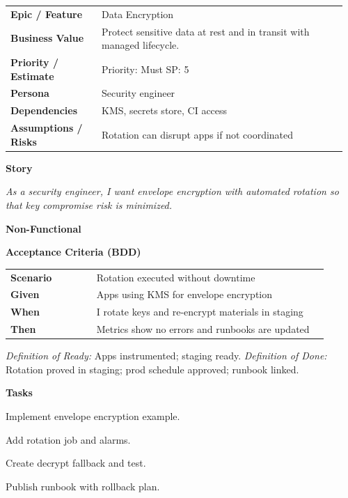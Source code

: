 \documentclass[11pt,letterpaper]{article}
\makeatletter
\newenvironment{kvtable}{%
  \par\noindent\begin{tabular}{@{}>{\raggedright\bfseries\arraybackslash}p{0.26\linewidth} >{\raggedright\arraybackslash}p{0.70\linewidth}@{}}
}{\end{tabular}\par}
\newenvironment{bdd}{%
  \par\noindent\begin{tabular}{@{}>{\raggedright\bfseries\arraybackslash}p{0.26\linewidth} >{\raggedright\arraybackslash}p{0.70\linewidth}@{}}
}{\end{tabular}\par}
\newcommand{\DoRDoD}[2]{%
  \vspace{0.35em}
  {\footnotesize\color{Muted}%
    \textit{Definition of Ready:} #1 \; \textbullet\;
    \textit{Definition of Done:} #2%
  }%
}
\newenvironment{storycard}[2]{%
  \begin{tcolorbox}[cloudcard, title={#1 --- #2}]%
}{\end{tcolorbox}}
\newcommand{\sectionlabel}[1]{\par\vspace{0.35em}\textbf{#1}\par}
\makeatother
\begin{document}
\begin{storycard}{CCS-11}{Ch. 11 — Cryptographic Key Management}
\begin{kvtable}
Epic / Feature & Data Encryption\\
Business Value & Protect sensitive data at rest and in transit with managed lifecycle.\\
Priority / Estimate & Priority: Must \quad SP: 5\\
Persona & Security engineer\\
Dependencies & KMS, secrets store, CI access\\
Assumptions / Risks & Rotation can disrupt apps if not coordinated\\
\end{kvtable}
\sectionlabel{Story}
\textit{As a security engineer, I want envelope encryption with automated rotation so that key compromise risk is minimized.}
\sectionlabel{Non-Functional}\;\;
\sectionlabel{Acceptance Criteria (BDD)}
\begin{bdd}
Scenario & Rotation executed without downtime\\
Given & Apps using KMS for envelope encryption\\
When & I rotate keys and re-encrypt materials in staging\\
Then & Metrics show no errors and runbooks are updated\\
\end{bdd}
\DoRDoD{Apps instrumented; staging ready.}{Rotation proved in staging; prod schedule approved; runbook linked.}
\sectionlabel{Tasks}
\begin{checklist}
\item Implement envelope encryption example.
\item Add rotation job and alarms.
\item Create decrypt fallback and test.
\item Publish runbook with rollback plan.
\end{checklist}
\end{storycard}
\end{document}
